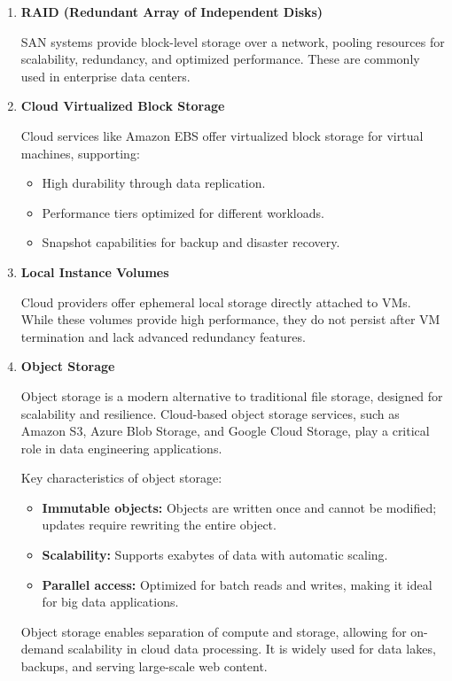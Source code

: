 \begin{enumerate}
    \item \textbf{RAID (Redundant Array of Independent Disks)}

    \noindent
    SAN systems provide block-level storage over a network, pooling resources for scalability, redundancy,
    and optimized performance. These are commonly used in enterprise data centers.


    \item \textbf{Cloud Virtualized Block Storage}
    
    \noindent
    Cloud services like Amazon EBS offer virtualized block storage for virtual machines, supporting:
    \begin{itemize}
        \item High durability through data replication.
        \item Performance tiers optimized for different workloads.
        \item Snapshot capabilities for backup and disaster recovery.
    \end{itemize}

    \item \textbf{Local Instance Volumes}
    
    \noindent
    Cloud providers offer ephemeral local storage directly attached to VMs. While these volumes
    provide high performance, they do not persist after VM termination and lack advanced redundancy features.

    \item \textbf{Object Storage}
    
    \noindent
    Object storage is a modern alternative to traditional file storage, designed for scalability and resilience.
    Cloud-based object storage services, such as Amazon S3, Azure Blob Storage, and Google Cloud Storage,
    play a critical role in data engineering applications.

    Key characteristics of object storage:
    \begin{itemize}
        \item \textbf{Immutable objects:} Objects are written once and cannot be modified; updates require rewriting the entire object.
        \item \textbf{Scalability:} Supports exabytes of data with automatic scaling.
        \item \textbf{Parallel access:} Optimized for batch reads and writes, making it ideal for big data applications.
    \end{itemize}
    Object storage enables separation of compute and storage, allowing for on-demand scalability in cloud data processing.
    It is widely used for data lakes, backups, and serving large-scale web content.



\end{enumerate}
